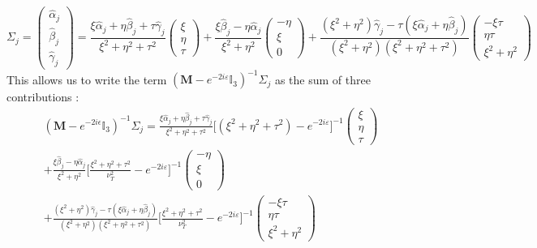 \begin{equation}
\Sigma_j=
    \begin{pmatrix}
    \hat{\alpha}_j\\ \hat{\beta}_j\\ \hat{\gamma}_j
    \end{pmatrix}
    = \frac{\xi\hat{\alpha}_j+\eta\hat{\beta}_j+\tau\hat{\gamma}_j}{\xi^2+\eta^2+\tau^2}\begin{pmatrix}
    \xi \\ \eta \\ \tau 
    \end{pmatrix} + \frac{\xi\hat{\beta}_j-\eta\hat{\alpha}_j}{\xi^2+\eta^2} \begin{pmatrix}
    -\eta \\ \xi \\ 0
    \end{pmatrix} + \frac{(\xi^2+\eta^2)\hat{\gamma}_j-\tau(\xi\hat{\alpha}_j+\eta\hat{\beta}_j)}{(\xi^2+\eta^2)(\xi^2+\eta^2+\tau^2)} \begin{pmatrix}
    -\xi\tau \\ \eta\tau \\ \xi^2+\eta^2
    \end{pmatrix}
\end{equation}
This allows us to write the term $(\mathbf{M}-e^{-2i\varepsilon}\mathbb{I}_3)^{-1} \Sigma_j$ as the sum of three contributions :
\begin{multline}
(\mathbf{M}-e^{-2i\epsilon}\mathbb{I}_3)^{-1} \Sigma_j=\frac{\xi\hat{\alpha}_j+\eta\hat{\beta}_j+\tau\hat{\gamma}_j}{\xi^2+\eta^2+\tau^2}\lbrack(\xi^2+\eta^2+\tau^2)-e^{-2i\varepsilon} \rbrack^{-1} \begin{pmatrix}
    \xi \\ \eta \\ \tau 
    \end{pmatrix} \\
+\frac{\xi\hat{\beta}_j-\eta\hat{\alpha}_j}{\xi^2+\eta^2} \lbrack \frac{\xi^2+\eta^2+\tau^2}{\nu_T^2}-e^{-2i\varepsilon} \rbrack^{-1} \begin{pmatrix}
    -\eta \\ \xi \\ 0
    \end{pmatrix}\\
    +\frac{(\xi^2+\eta^2)\hat{\gamma}_j-\tau(\xi\hat{\alpha}_j+\eta\hat{\beta}_j)}{(\xi^2+\eta^2)(\xi^2+\eta^2+\tau^2)} \lbrack \frac{\xi^2+\eta^2+\tau^2}{\nu_T^2}-e^{-2i\varepsilon} \rbrack^{-1} \begin{pmatrix}
    -\xi\tau \\ \eta\tau \\ \xi^2+\eta^2
    \end{pmatrix}
    \label{invspectre}
\end{multline}
